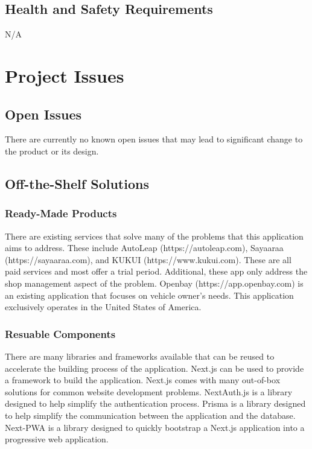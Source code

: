 \documentclass[12pt]{article}
\begin{document}
\subsection{Health and Safety Requirements}
N/A

\section{Project Issues}

\subsection{Open Issues}

There are currently no known open issues that may lead to significant change to the product or its
design.

\subsection{Off-the-Shelf Solutions}

\subsubsection{Ready-Made Products}

There are existing services that solve many of the problems that this application aims to address.
These include AutoLeap (https://autoleap.com), Sayaaraa (https://sayaaraa.com), and KUKUI
(https://www.kukui.com). These are all paid services and most offer a trial period. Additional,
these app only address the shop management aspect of the problem. Openbay (https://app.openbay.com)
is an existing application that focuses on vehicle owner's needs. This application exclusively
operates in the United States of America.

\subsubsection{Resuable Components}

There are many libraries and frameworks available that can be reused to accelerate the building
process of the application. Next.js can be used to provide a framework to build the application.
Next.js comes with many out-of-box solutions for common website development problems. NextAuth.js
is a library designed to help simplify the authentication process. Prisma is a library designed to
help simplify the communication between the application and the database. Next-PWA is a library
designed to quickly bootstrap a Next.js application into a progressive web application.
\end{document}
